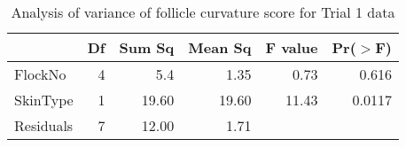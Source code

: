 \begin{table}[ht]
\centering
\caption{Analysis of variance of follicle curvature score for Trial 1 data}
\label{tab:curvaov}
\begin{tabular}{lrrrrr}
  \hline
 & Df & Sum Sq & Mean Sq & F value & Pr($>$F) \\ 
  \hline
FlockNo & 4 & 5.4 & 1.35 & 0.73 & 0.616 \\ 
  SkinType & 1 & 19.60 & 19.60 & 11.43 & 0.0117 \\ 
  Residuals & 7 & 12.00 & 1.71 &  &  \\ 
   \hline
\end{tabular}
\end{table}

